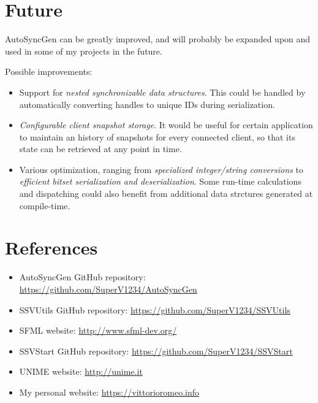 \documentclass{report}
\begin{document}
            \section{Future}

                AutoSyncGen can be greatly improved, and will probably be expanded upon and used in some of my projects in the future.

                Possible improvements:

                \begin{itemize}
                    \item Support for \emph{nested synchronizable data structures}. This could be handled by automatically converting handles to unique IDs during serialization.
                    \item \emph{Configurable client snapshot storage}. It would be useful for certain application to maintain an history of snapshots for every connected client, so that its state can be retrieved at any point in time.
                    \item Various optimization, ranging from \emph{specialized integer/string conversions} to \emph{efficient bitset serialization and deserialization}. Some run-time calculations and dispatching could also benefit from additional data strctures generated at compile-time.
                \end{itemize}

            \section{References}

                \begin{itemize}
                  \item AutoSyncGen GitHub repository: \url{https://github.com/SuperV1234/AutoSyncGen}
                  \item SSVUtils GitHub repository: \url{https://github.com/SuperV1234/SSVUtils}
                  \item SFML website: \url{http://www.sfml-dev.org/}
                  \item SSVStart GitHub repository: \url{https://github.com/SuperV1234/SSVStart}
                  \item UNIME website: \url{http://unime.it}
                  \item My personal website: \url{https://vittorioromeo.info}
                \end{itemize}
            
\end{document}
